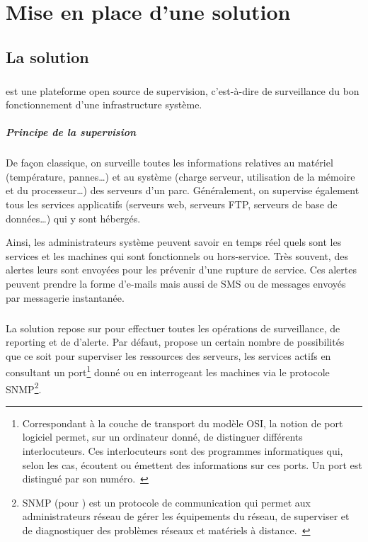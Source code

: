 \chapter{Mise en place d'une solution \acentreon{}}
\label{section:centreon}

\section{La solution \acentreon}

\paragraph{}
\acentreon{} est une plateforme open source de supervision, c'est-à-dire de surveillance du bon fonctionnement d'une infrastructure système.

\paragraph{Principe de la supervision}
De façon classique, on surveille toutes les informations relatives au matériel (température, pannes\ldots) et au système (charge serveur, utilisation de la mémoire et du processeur\ldots) des serveurs d'un parc.
Généralement, on supervise également tous les services applicatifs (serveurs web, serveurs FTP, serveurs de base de données\ldots) qui y sont hébergés.

Ainsi, les administrateurs système peuvent savoir en temps réel quels sont les services et les machines qui sont fonctionnels ou hors-service.
Très souvent, des alertes leurs sont envoyées pour les prévenir d'une rupture de service.
Ces alertes peuvent prendre la forme d'e-mails mais aussi de SMS ou de messages envoyés par messagerie instantanée.

\paragraph{\anagios}
La solution \acentreon{} repose sur \anagios{} pour effectuer toutes les opérations de surveillance, de reporting et de d'alerte.
Par défaut, \anagios{} propose un certain nombre de possibilités que ce soit pour superviser les ressources des serveurs, les services actifs en consultant un port\footnote{Correspondant à la couche de transport du modèle OSI, la notion de port logiciel permet, sur un ordinateur donné, de distinguer différents interlocuteurs. Ces interlocuteurs sont des programmes informatiques qui, selon les cas, écoutent ou émettent des informations sur ces ports. Un port est distingué par son numéro.~\cite{port}} donné ou en interrogeant les machines via le protocole SNMP\footnote{SNMP (pour ) est un protocole de communication qui permet aux administrateurs réseau de gérer les équipements du réseau, de superviser et de diagnostiquer des problèmes réseaux et matériels à distance.~\cite{snmp}}.

